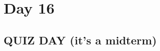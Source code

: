 \documentclass[../notes.tex]{subfiles}
\begin{document}
\section{Day 16}
\subsection{QUIZ DAY (it's a midterm)}
\end{document}

